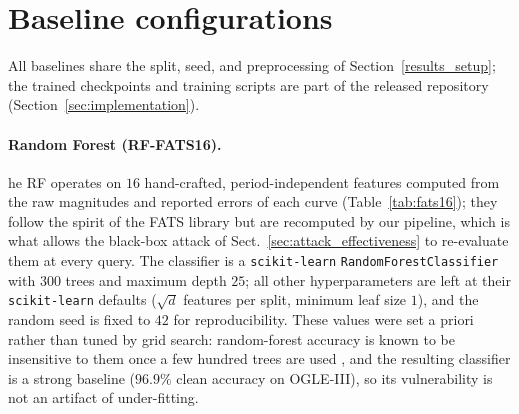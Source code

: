 \documentclass{aa}
\begin{document}







\FloatBarrier %

\section{Baseline configurations}
\label{app:baselines}

All baselines share the split, seed, and preprocessing of
Section~\ref{results_setup}; the trained checkpoints and training scripts
are part of the released repository (Section~\ref{sec:implementation}).

\paragraph{Random Forest (RF-FATS16).}
he RF operates on $16$ hand-crafted, period-independent features computed
from the raw magnitudes and reported errors of each curve
(Table~\ref{tab:fats16}); they follow the spirit of the FATS library
\citep{nun2015fats} but are recomputed by our pipeline, which is what
allows the black-box attack of Sect.~\ref{sec:attack_effectiveness} to
re-evaluate them at every query. The classifier is a
\texttt{scikit-learn} \texttt{RandomForestClassifier} with $300$ trees and
maximum depth $25$; all other hyperparameters are left at their
\texttt{scikit-learn} defaults ($\sqrt{d}$ features per split, minimum leaf
size $1$), and the random seed is fixed to $42$ for reproducibility. These
values were set a priori rather than tuned by grid search: random-forest
accuracy is known to be insensitive to them once a few hundred trees are
used \citep{breiman2001random,hastie2009elements}, and the resulting
classifier is a strong baseline ($96.9\%$ clean accuracy on OGLE-III),
so its vulnerability is not an artifact of under-fitting.
\end{document}
